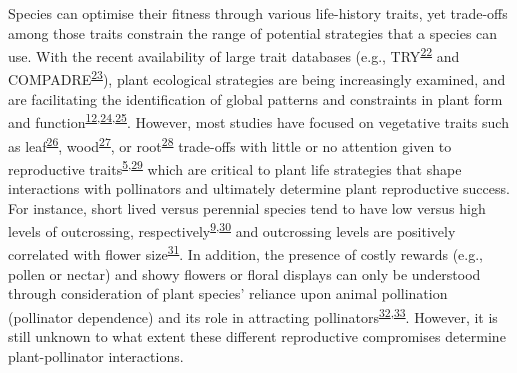 \documentclass[12pt,a4paper,]{article}
\begin{document}
Species can optimise their fitness through various life-history traits,
yet trade-offs among those traits constrain the range of potential
strategies that a species can use. With the recent availability of large
trait databases (e.g.,
TRY\textsuperscript{\protect\hyperlink{ref-kattge2011}{22}} and
COMPADRE\textsuperscript{\protect\hyperlink{ref-salguero2015}{23}}),
plant ecological strategies are being increasingly examined, and are
facilitating the identification of global patterns and constraints in
plant form and
function\textsuperscript{\protect\hyperlink{ref-salguero2016}{12},\protect\hyperlink{ref-diaz2016}{24},\protect\hyperlink{ref-carmona2021}{25}}.
However, most studies have focused on vegetative traits such as
leaf\textsuperscript{\protect\hyperlink{ref-wright2004}{26}},
wood\textsuperscript{\protect\hyperlink{ref-chave2009}{27}}, or
root\textsuperscript{\protect\hyperlink{ref-laughlin2021}{28}}
trade-offs with little or no attention given to reproductive
traits\textsuperscript{\protect\hyperlink{ref-roddy2021}{5},\protect\hyperlink{ref-evojtko2020}{29}}
which are critical to plant life strategies that shape interactions with
pollinators and ultimately determine plant reproductive success. For
instance, short lived versus perennial species tend to have low versus
high levels of outcrossing,
respectively\textsuperscript{\protect\hyperlink{ref-moeller2017}{9},\protect\hyperlink{ref-barrett2003}{30}}
and outcrossing levels are positively correlated with flower
size\textsuperscript{\protect\hyperlink{ref-goodwillie2010}{31}}. In
addition, the presence of costly rewards (e.g., pollen or nectar) and
showy flowers or floral displays can only be understood through
consideration of plant species' reliance upon animal pollination
(pollinator dependence) and its role in attracting
pollinators\textsuperscript{\protect\hyperlink{ref-ollerton2011}{32},\protect\hyperlink{ref-rodger2021}{33}}.
However, it is still unknown to what extent these different reproductive
compromises determine plant-pollinator interactions.
\end{document}
